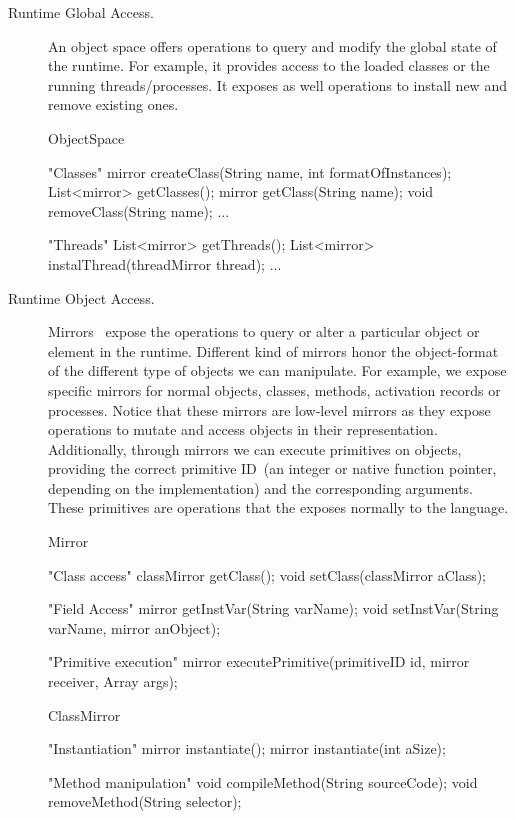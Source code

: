 \begin{description}
\item[Runtime Global Access.] An object space offers operations to query and modify the global state of the runtime. For example, it provides access to the loaded classes or the running threads/processes. It exposes as well operations to install new and remove existing ones.

\begin{code}
ObjectSpace {
    "Classes"
    mirror createClass(String name, int formatOfInstances);
    List<mirror> getClasses();
    mirror getClass(String name);
    void removeClass(String name);
    ...

    "Threads"
    List<mirror> getThreads();
    List<mirror> instalThread(threadMirror thread);
    ...
}
\end{code}

\item[Runtime Object Access.] Mirrors~\cite{Brac04b} expose the operations to query or alter a particular object or element in the runtime. Different kind of mirrors honor the object-format of the different type of objects we can manipulate. For example, we expose specific mirrors for normal objects, classes, methods, activation records or processes. Notice that these mirrors are low-level mirrors as they expose operations to mutate and access objects in their \VM representation. Additionally, through mirrors we can execute \VM primitives on objects, providing the correct primitive ID~(an integer or native function pointer, depending on the implementation) and the corresponding arguments. These primitives are operations that the \VM exposes normally to the language.

\begin{code}
Mirror {
    "Class access"
    classMirror getClass();
    void setClass(classMirror aClass);

    "Field Access"
    mirror getInstVar(String varName);
    void setInstVar(String varName, mirror anObject);
    
    "Primitive execution"
    mirror executePrimitive(primitiveID id, mirror receiver, Array args);
}
\end{code}

\begin{code}
ClassMirror {
    "Instantiation"
    mirror instantiate();
    mirror instantiate(int aSize);

    "Method manipulation"    
    void compileMethod(String sourceCode);
    void removeMethod(String selector);
}
\end{code}

\end{description}

